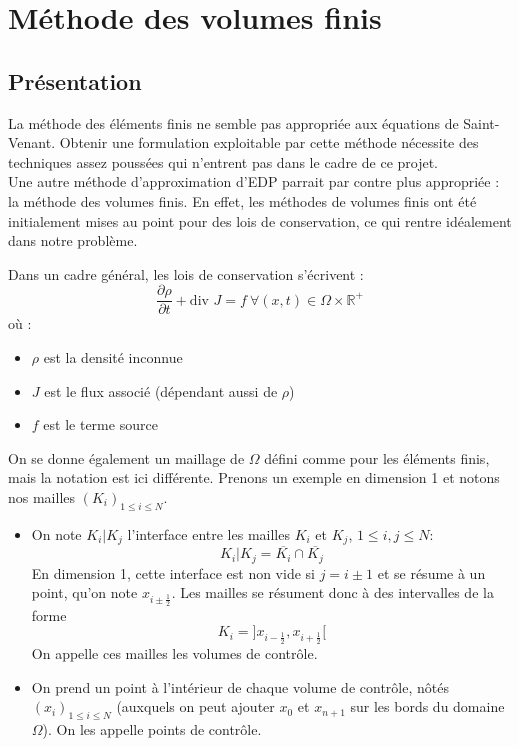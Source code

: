 \section{Méthode des volumes finis}
	\subsection{Présentation}
La méthode des éléments finis ne semble pas appropriée aux équations de Saint-Venant. Obtenir une formulation exploitable par cette méthode nécessite des techniques assez poussées qui n'entrent pas dans le cadre de ce projet.\\
Une autre méthode d'approximation d'EDP parrait par contre plus appropriée : la méthode des volumes finis. En effet, les méthodes de volumes finis ont été initialement mises au point pour des lois de conservation, ce qui rentre idéalement dans notre problème.

\bigskip
Dans un cadre général, les lois de conservation s'écrivent :
\begin{equation}
	\frac{\partial \rho}{\partial t} + \text{div } J = f \ \forall(x,t)\in\Omega\times\mathbb{R}^+
\end{equation}
où :
\begin{itemize}
	\item $\rho$ est la densité inconnue
	\item $J$ est le flux associé (dépendant aussi de $\rho$)
	\item $f$ est le terme source
\end{itemize}

On se donne également un maillage de $\Omega$ défini comme pour les éléments finis, mais la notation est ici différente. Prenons un exemple en dimension 1 et notons nos mailles $(K_i)_{1\leq i\leq N}$.
\begin{itemize}
	\item On note $K_i|K_j$ l'interface entre les mailles $K_i$ et $K_j$, $1\leq i,j\leq N$: \[K_i|K_j=\overline{K_i}\cap\overline{K_j}\]
		En dimension 1, cette interface est non vide si $j=i\pm 1$ et se résume à un point, qu'on note $x_{i\pm\frac{1}{2}}$. Les mailles se résument donc à des intervalles de la forme \[K_i=]x_{i-\frac{1}{2}},x_{i+\frac{1}{2}}[\] On appelle ces mailles les volumes de contrôle.
	\item On prend un point à l'intérieur de chaque volume de contrôle, nôtés $(x_i)_{1\leq i\leq N}$ (auxquels on peut ajouter $x_0$ et $x_{n+1}$ sur les bords du domaine $\Omega$). On les appelle points de contrôle.
\end{itemize}


